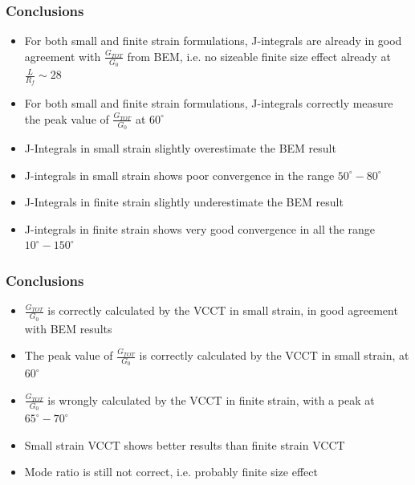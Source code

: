 \documentclass[first,firstsupp,lastsupp,handout,last,hyperref,table]{ETHclass}
\begin{document}
\begin{frame}
\frametitle{\small Conclusions}
\vspace{-0.5cm}
\centering
\begin{itemize}[label=]
\item For both small and finite strain formulations, J-integrals are already in good agreement with $\frac{G_{TOT}}{G_{0}}$ from BEM, i.e. no sizeable finite size effect already at $\frac{L}{R_{f}}\sim 28$
\item For both small and finite strain formulations, J-integrals correctly measure the peak value of $\frac{G_{TOT}}{G_{0}}$ at $60^{\circ}$
\item J-Integrals in small strain slightly overestimate the BEM result
\item J-integrals in small strain shows poor convergence in the range $50^{\circ}-80^{\circ}$
\item J-Integrals in finite strain slightly underestimate the BEM result
\item J-integrals in finite strain shows very good convergence in all the range $10^{\circ}-150^{\circ}$
\end{itemize}
\end{frame}

\begin{frame}
\frametitle{\small Conclusions}
\vspace{-0.5cm}
\centering
\begin{itemize}[label=]
\item $\frac{G_{TOT}}{G_{0}}$ is correctly calculated by the VCCT in small strain, in good agreement with BEM results
\item The peak value of $\frac{G_{TOT}}{G_{0}}$ is correctly calculated by the VCCT in small strain, at $60^{\circ}$
\item $\frac{G_{TOT}}{G_{0}}$ is wrongly calculated by the VCCT in finite strain, with a peak at $65^{\circ}-70^{\circ}$
\item Small strain VCCT shows better results than finite strain VCCT
\item Mode ratio is still not correct, i.e. probably finite size effect
\end{itemize}
\end{frame}
\end{document}
